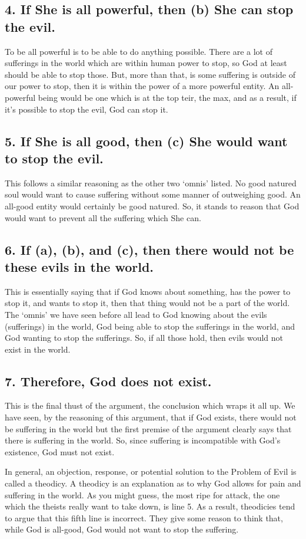 \subsection{4. If She is all powerful, then (b) She can stop the evil.} 
To be all powerful is to be able to do anything possible. There are a lot of sufferings in the world which are within human power to stop, so God at least should be able to stop those. But, more than that, is some suffering is outside of our power to stop, then it is within the power of a more powerful entity. An all-powerful being would be one which is at the top teir, the max, and as a result, if it's possible to stop the evil, God can stop it.
\subsection{5. If She is all good, then (c) She would want to stop the evil.}
This follows a similar reasoning as the other two `omnis' listed. No good natured soul would want to cause suffering without some manner of outweighing good. An all-good entity would certainly be good natured. So, it stands to reason that God would want to prevent all the suffering which She can. 
\subsection{6. If (a), (b), and (c), then there would not be these evils in the world.}
This is essentially saying that if God knows about something, has the power to stop it, and wants to stop it, then that thing would not be a part of the world. The `omnis' we have seen before all lead to God knowing about the evils (sufferings) in the world, God being able to stop the sufferings in the world, and God wanting to stop the sufferings. So, if all those hold, then evils would not exist in the world.
\subsection{7. Therefore, God does not exist.}
This is the final thust of the argument, the conclusion which wraps it all up. We have seen, by the reasoning of this argument, that if God exists, there would not be suffering in the world but the first premise of the argument clearly says that there is suffering in the world. So, since suffering is incompatible with God's existence, God must not exist. 

In general, an objection, response, or potential solution to the Problem of Evil is called a \gls{theodicy}. A theodicy is an explanation as to why God allows for pain and suffering in the world. As you might guess, the most ripe for attack, the one which the theists really want to take down, is line 5. As a result, theodicies tend to argue that this fifth line is incorrect. They give some reason to think that, while God is all-good, God would not want to stop the suffering.

